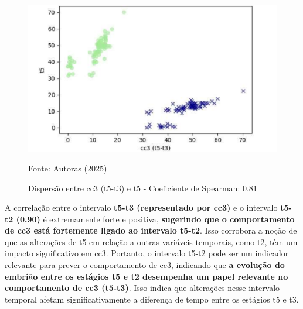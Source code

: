 \begin{figure}[h]
    \captionsetup{font=footnotesize, justification=centering, labelsep=period, position=above}
    \caption{Dispersão entre cc3 (t5-t3) e t5 - Coeficiente de Spearman: 0.81}
    \label{fig:cc3-t5}
    \centering
    \includegraphics[scale=0.5]{figuras/Spearman/cc3-t5.pdf}
    \vspace{0.3cm} 
    \begin{minipage}{\linewidth}
        \centering
        \scriptsize{Fonte: Autoras (2025)}
    \end{minipage}
\end{figure}
\FloatBarrier

A correlação entre o intervalo \textbf{t5-t3 (representado por cc3)} e o intervalo \textbf{t5-t2 (0.90)} é extremamente forte e positiva, \textbf{sugerindo que o comportamento de cc3 está fortemente ligado ao intervalo t5-t2}. Isso corrobora a noção de que as alterações de t5 em relação a outras variáveis temporais, como t2, têm um impacto significativo em cc3. Portanto, o intervalo t5-t2 pode ser um indicador relevante para prever o comportamento de cc3, indicando que \textbf{a evolução do embrião entre os estágios t5 e t2 desempenha um papel relevante no comportamento de cc3 (t5-t3)}. Isso indica que alterações nesse intervalo temporal afetam significativamente a diferença de tempo entre os estágios t5 e t3. 

